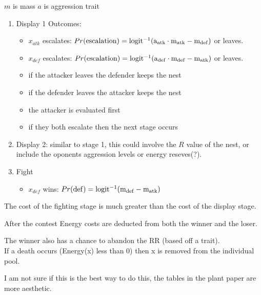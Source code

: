 \documentclass[a4paper,11pt]{article}
\begin{document}
$m$ is mass
$a$ is aggression trait
\begin{enumerate}
    \item Display 1
        Outcomes:
        \begin{itemize}
            \item $x_{atk}$ escalates: 
                $Pr(\rm{escalation}) =  logit^{-1}(a_{atk} \cdot m_{atk} - m_{def})$
                or leaves.
            \item $x_{def}$ escalates:
                $Pr(\rm{escalation}) =  logit^{-1}(a_{def} \cdot m_{def} - m_{atk})$ 
                or leaves.
            \item if the attacker leaves the defender keeps the nest
            \item if the defender leaves the attacker keeps the nest
            \item the attacker is evaluated first
            \item if they both escalate then the next stage occurs
        \end{itemize}
    \item Display 2:
        similar to stage 1, this could involve the $R$ value of the nest, or include the oponents aggression levels or energy reseves(?).
    \item Fight
        \begin{itemize}
            \item $x_{def}$ wins:
            $Pr(\rm{def}) = logit^{-1}(m_{def} - m_{atk})$
        \end{itemize}
\end{enumerate}
The cost of the fighting stage is much greater than the cost of the display stage.

After the contest Energy costs are deducted from both the winner and the loser.

The winner also has a chance to abandon the RR (based off a trait).\\

If a death occurs (Energy(x) less than 0) then x is removed from the individual pool.


\clearpage

I am not sure if this is the best way to do this, the tables in the plant paper are more aesthetic.\\
\end{document}

